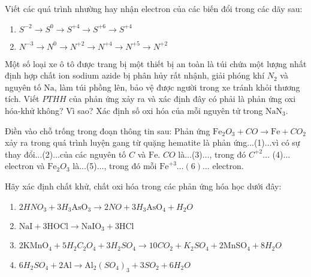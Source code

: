 \begin{bt}
	Viết các quá trình nhường hay nhận electron của các biến đổi trong các dãy sau:
	\begin{enumerate}
		\item $S^{-2} \to S^0\to S^{+4} \to S^{+6} \to S^{+4}$
		\item $N^{-3} \to N^0\to N^{+2} \to N^{+4} \to N^{+5} \to N^{+2}$
	\end{enumerate}
	\loigiai{}
\end{bt}
\begin{bt}
	Một số loại xe ô tô được trang bị một thiết bị an toàn là túi chứa một lượng nhất định hợp chất ion sodium azide bị phân hủy rất nhậnh, giải phóng khí $N_2$ và nguyên tố $\mathrm{Na}$, làm túi phồng lên, bảo vệ được người trong xe tránh khỏi thương tích. Viết $PTHH$ của phản ứng xảy ra và xác định đây có phải là phản ứng oxi hóa-khử không? Vì sao? Xác định số oxi hóa của mỗi nguyên tử trong $\mathrm{NaN}_3$.
	\loigiai{}
\end{bt}
\begin{bt}
	Điền vào chỗ trống trong đoạn thông tin sau:
	Phản ứng $\mathrm{Fe}_2O_3+CO \to \mathrm{Fe}+CO_2$ xảy ra trong quá trình luyện gang từ quặng hematite là phản ứng...(1)$\ldots$vì có sự thay đổi$\ldots$(2)$\ldots$của các nguyên tố $C$ và $\mathrm{Fe}$. $CO$ là$\ldots$(3)$\ldots$, trong đó $C^{+2} \ldots$ (4)$\ldots$electron và $\mathrm{Fe}_2O_3$ là$\ldots$(5)$\ldots$, trong đó mỗi $\mathrm{Fe}^{+3} \ldots(6) \ldots$ electron.
	\loigiai{}
\end{bt}
\begin{bt}[][][]
	Hãy xác định chất khử, chất oxi hóa trong các phản ứng hóa học dưới đây:
	\begin{enumerate}
		\item $2HNO_3+3H_3\mathrm{AsO}_3\to 2NO+3H_3\mathrm{AsO}_4+H_2O$
		\item $\mathrm{NaI}+3\mathrm{HOCl} \to \mathrm{NaIO}_3+3\mathrm{HCl}$
		\item $2\mathrm{KMnO}_4+5H_2C_2O_4+3H_2SO_4\to 10CO_2+K_2SO_4+2\mathrm{MnSO}_4+8H_2O$
		\item $6H_2SO_4+2\mathrm{Al} \to \mathrm{Al}_2\left(SO_4\right)_3+3SO_2+6H_2O$
	\end{enumerate}
	\loigiai{}
\end{bt}


